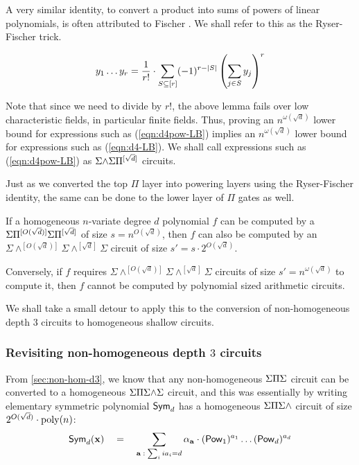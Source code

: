 A very similar identity, to convert a product into sums of powers of
linear polynomials, is often attributed to Fischer \cite{fischer}.
We shall refer to this as the Ryser-Fischer trick. 

\begin{lemma}\label{lem:ryser-fischer}
$$y_1 \dots y_r  = \frac{1}{r!} \cdot \sum_{S\subseteq [r]} (-1)^{r- |S|} \left(\sum_{j\in S} y_j\right)^r$$
\end{lemma}

Note that since we need to divide by $r!$, the above lemma fails over
low characteristic fields, in particular finite fields.
Thus, proving an $n^{\omega(\sqrt{d})}$ lower bound for expressions
such as (\ref{eqn:d4pow-LB}) implies an $n^{\omega(\sqrt{d})}$ lower
bound for expressions such as (\ref{eqn:d4-LB}).
We shall call expressions such as (\ref{eqn:d4pow-LB}) as
$\Sigma\mathord{\wedge}\Sigma\Pi^{[\sqrt{d}]}$ circuits. 

Just as we converted the top $\Pi$ layer into powering layers using
the Ryser-Fischer identity, the same can be done to the lower layer of
$\Pi$ gates as well.

\begin{corollary}\label{cor:pow-genckt}
  If a homogeneous $n$-variate degree $d$ polynomial $f$ can be
  computed by a $\Sigma\Pi^{[O(\sqrt{d})]}\Sigma\Pi^{[\sqrt{d}]}$ of size $s =
  n^{O(\sqrt{d})}$, then $f$ can also be computed by an
  $\Sigma\mathord{\wedge^{[O(\sqrt{d})]}}\Sigma\mathord{\wedge^{[\sqrt{d}]}}\Sigma$
  circuit of size $s' = s \cdot 2^{O(\sqrt{d})}$. 

  Conversely, if $f$ requires
  $\Sigma\mathord{\wedge^{[O(\sqrt{d})]}}\Sigma\mathord{\wedge^{[\sqrt{d}]}}\Sigma$
  circuits of size $s' = n^{\omega(\sqrt{d})}$ to compute it, then $f$
  cannot be computed by polynomial sized arithmetic circuits. 
\end{corollary}

We shall take a small detour to apply this to the conversion of non-homogeneous depth $3$
circuits  to homogeneous shallow circuits.

\subsubsection{Revisiting non-homogeneous depth $3$ circuits}

From \autoref{sec:non-hom-d3}, we know that any non-homogeneous $\Sigma\Pi\Sigma$
circuit can be converted to a homogeneous $\Sigma\Pi\Sigma\mathord{\wedge}\Sigma$ circuit, and
this was essentially by writing elementary symmetric polynomial
$\operatorname{\mathsf{Sym}}_d$ has a homogeneous $\Sigma\Pi\Sigma\mathord{\wedge}$ circuit of size $2^{O(\sqrt{d})}
\cdot \operatorname{poly}(n)$:
\[
\operatorname{\mathsf{Sym}}_d(\mathbf{x}) \quad = \quad \sum_{\mathbf{a}\;:\; \sum_i ia_i = d} \alpha_{\mathbf{a}} \cdot (\operatorname{\mathsf{Pow}}_1)^{a_1}\dots (\operatorname{\mathsf{Pow}}_d)^{a_d}
\]

